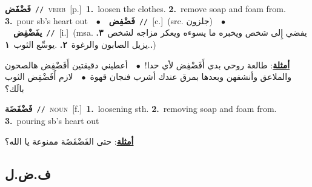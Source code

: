 \documentclass[10pt,a4paper,twoside]{article} %
\begin{document}
\begin{multicols}{2}
{\setlength\topsep{0pt}\textbf{\foreignlanguage{arabic}{فَضْفَض}}\ {\color{gray}\texttt{//}\color{black}}\ \textsc{verb}\ [p.]\ \textbf{1.}~loosen the clothes.  \textbf{2.}~remove soap and foam from.  \textbf{3.}~pour sb's heart out\ \ $\bullet$\ \ \setlength\topsep{0pt}\textbf{\foreignlanguage{arabic}{فَضْفِض}}\ {\color{gray}\texttt{//}\color{black}}\ [c.]\ (src. \color{gray}\foreignlanguage{arabic}{جلزون}\color{black})\ \ $\bullet$\ \ \setlength\topsep{0pt}\textbf{\foreignlanguage{arabic}{يفَضْفِض}}\ {\color{gray}\texttt{//}\color{black}}\ [i.]\ \color{gray}(msa. \foreignlanguage{arabic}{يفضي إِلى شخص ويخبره ما يسوءه ويعكر مزاجه لشخص}~\foreignlanguage{arabic}{\textbf{٣.}}  .\foreignlanguage{arabic}{يزيل الصابون والرغوة}~\foreignlanguage{arabic}{\textbf{٢.}}  .\foreignlanguage{arabic}{يوسِّع الثوب}~\foreignlanguage{arabic}{\textbf{١.}})\color{black}\  \begin{flushright}\color{gray}\foreignlanguage{arabic}{\textbf{\underline{\foreignlanguage{arabic}{أمثلة}}}: طالعة روحي بدي أَفَضْفِض لأي حدا!\ $\bullet$\ \  أعطيني دقيقتين أَفَضْفِض هالصحون والملاعق وأنشفهن وبعدها بمرق عندك أشرب فنجان قهوة\ $\bullet$\ \  لازم أَفَضْفِض الثوب بالَك؟}\end{flushright}\color{black}} \vspace{2mm}

{\setlength\topsep{0pt}\textbf{\foreignlanguage{arabic}{فَضْفَضَة}}\ {\color{gray}\texttt{//}\color{black}}\ \textsc{noun}\ [f.]\ \textbf{1.}~loosening sth.  \textbf{2.}~removing soap and foam from.  \textbf{3.}~pouring sb's heart out\  \begin{flushright}\color{gray}\foreignlanguage{arabic}{\textbf{\underline{\foreignlanguage{arabic}{أمثلة}}}: حتى الفَضْفَضَة ممنوعة يا الله؟}\end{flushright}\color{black}} \vspace{2mm}

\vspace{-3mm}
\subsection*{\color{blue}\foreignlanguage{arabic}{ف.ض.ل}\color{blue}{}} 


\end{multicols}
\end{document}
